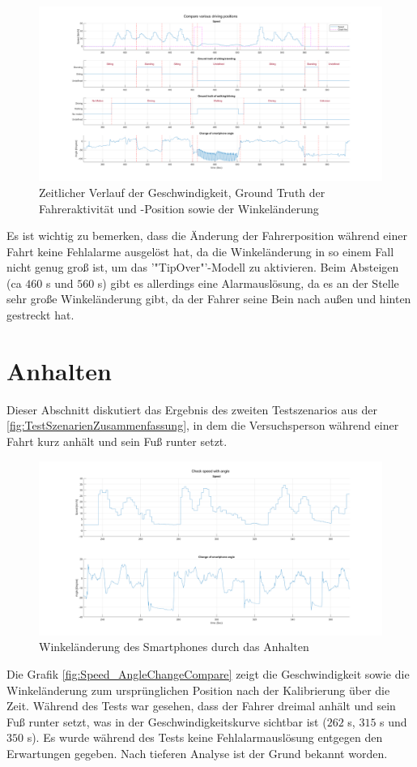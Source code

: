\begin{figure}[H]
	\centering
	\includegraphics[width=\linewidth]{Bilder/Speed_Groundtruth_WalkStand_Compare.png}
	\caption{Zeitlicher Verlauf der Geschwindigkeit, Ground Truth der Fahreraktivität und -Position sowie der Winkeländerung}
	\label{fig:Speed_Groundtruth_WalkStand_Compare}
\end{figure}

Es ist wichtig zu bemerken, dass die Änderung der Fahrerposition während einer Fahrt keine Fehlalarme ausgelöst hat, da die Winkeländerung in so einem Fall nicht genug groß ist, um das '"TipOver"'-Modell zu aktivieren. Beim Absteigen (ca $460$ s und $560$ s) gibt es allerdings eine Alarmauslösung, da es an der Stelle sehr große Winkeländerung gibt, da der Fahrer seine Bein nach außen und hinten gestreckt hat.
\section{Anhalten}
Dieser Abschnitt diskutiert das Ergebnis des zweiten Testszenarios aus der \autoref{fig:TestSzenarienZusammenfassung}, in dem die Versuchsperson während einer Fahrt kurz anhält und sein Fuß runter setzt.

\begin{figure}[H]
	\centering
	\includegraphics[width=\linewidth]{Bilder/Speed_AngleChangeCompare.png}
	\caption{Winkeländerung des Smartphones durch das Anhalten}
	\label{fig:Speed_AngleChangeCompare}
\end{figure}
Die Grafik \autoref{fig:Speed_AngleChangeCompare} zeigt die Geschwindigkeit sowie die Winkeländerung zum ursprünglichen Position nach der Kalibrierung über die Zeit.
Während des Tests war gesehen, dass der Fahrer dreimal anhält und sein Fuß runter setzt, was in der Geschwindigkeitskurve sichtbar ist ($262$ s, $315$ s und $350$ s). Es wurde während des Tests keine Fehlalarmauslösung entgegen den Erwartungen gegeben. Nach tieferen Analyse ist der Grund bekannt worden.


